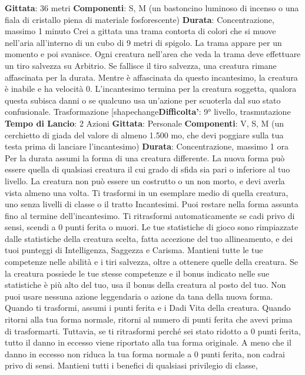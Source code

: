 \begin{multicols}{2}
\textbf{Gittata}: 36 metri
\textbf{Componenti}: S, M (un bastoncino luminoso di incenso
o una fiala di cristallo piena di materiale fosforescente)
\textbf{Durata}: Concentrazione, massimo 1 minuto
Crei a gittata una trama contorta di colori che si muove
nell’aria all’interno di un cubo di 9 metri di spigolo. La
trama appare per un momento e poi svanisce. Ogni
creatura nell’area che veda la trama deve effettuare un
tiro salvezza su Arbitrio. Se fallisce il tiro salvezza,
una creatura rimane affascinata per la durata. Mentre è
affascinata da questo incantesimo, la creatura è inabile
e ha velocità 0.
L’incantesimo termina per la creatura soggetta, qualora
questa subisca danni o se qualcuno usa un’azione per
scuoterla dal suo stato confusionale.
Trasformazione
[shapechange\textbf{Difficolta'}:
9° livello, trasmutazione
\textbf{Tempo di Lancio}: 2 Azioni
\textbf{Gittata}: Personale
\textbf{Componenti}: V, S, M (un cerchietto di giada del valore
di almeno 1.500 mo, che devi poggiare sulla tua testa
prima di lanciare l’incantesimo)
\textbf{Durata}: Concentrazione, massimo 1 ora
Per la durata assumi la forma di una creatura differente.
La nuova forma può essere quella di qualsiasi creatura
il cui grado di sfida sia pari o inferiore al tuo livello. La 
creatura non può essere un costrutto o un non morto, e
devi averla vista almeno una volta. Ti trasformi in un
esemplare medio di quella creatura, uno senza livelli di
classe o il tratto Incantesimi.
Puoi restare nella forma assunta fino al termine
dell’incantesimo. Ti ritrasformi automaticamente se cadi
privo di sensi, scendi a 0 punti ferita o muori.
Le tue statistiche di gioco sono rimpiazzate dalle
statistiche della creatura scelta, fatta accezione del tuo
allineamento, e dei tuoi punteggi di Intelligenza,
Saggezza e Carisma. Mantieni tutte le tue competenze
nelle abilità e i tiri salvezza, oltre a ottenere quelle della
creatura. Se la creatura possiede le tue stesse
competenze e il bonus indicato nelle sue statistiche è
più alto del tuo, usa il bonus della creatura al posto del
tuo. Non puoi usare nessuna azione leggendaria o
azione da tana della nuova forma.
Quando ti trasformi, assumi i punti ferita e i Dadi Vita
della creatura. Quando ritorni alla tua forma normale,
ritorni al numero di punti ferita che avevi prima di
trasformarti. Tuttavia, se ti ritrasformi perché sei stato
ridotto a 0 punti ferita, tutto il danno in eccesso viene
riportato alla tua forma originale. A meno che il danno in
eccesso non riduca la tua forma normale a 0 punti
ferita, non cadrai privo di sensi.
Mantieni tutti i benefici di qualsiasi privilegio di classe,

\end{multicols}
